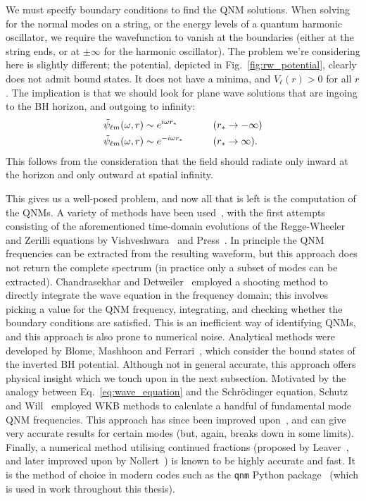 We must specify boundary conditions to find the QNM solutions.
When solving for the normal modes on a string, or the energy levels of a quantum harmonic oscillator, we require the wavefunction to vanish at the boundaries (either at the string ends, or at $\pm \infty$ for the harmonic oscillator).
The problem we're considering here is slightly different; the potential, depicted in Fig.~\ref{fig:rw_potential}, clearly does not admit bound states. 
It does not have a minima, and $V_\ell(r) > 0$ for all $r$.
The implication is that we should look for plane wave solutions that are ingoing to the BH horizon, and outgoing to infinity:
\begin{alignat}{2}
    &\tilde{\psi}_{\ell m}(\omega, r) \sim e^{i \omega r_*} \qquad &&\qty(r_* \rightarrow -\infty) \nonumber \\
    &\tilde{\psi}_{\ell m}(\omega, r) \sim e^{- i \omega r_*} \qquad &&\qty(r_* \rightarrow \infty).
\end{alignat}
This follows from the consideration that the field should radiate only inward at the horizon and only outward at spatial infinity.

This gives us a well-posed problem, and now all that is left is the computation of the QNMs. 
A variety of methods have been used~\cite{Kokkotas:1999bd, Berti:2004md}, with the first attempts consisting of the aforementioned time-domain evolutions of the Regge-Wheeler and Zerilli equations by Vishveshwara~\cite{Vishveshwara:1970zz} and Press~\cite{Press:1971wr}. 
In principle the QNM frequencies can be extracted from the resulting waveform, but this approach does not return the complete spectrum (in practice only a subset of modes can be extracted).
Chandrasekhar and Detweiler~\cite{Chandrasekhar:1975zza} employed a shooting method to directly integrate the wave equation in the frequency domain; this involves picking a value for the QNM frequency, integrating, and checking whether the boundary conditions are satisfied. 
This is an inefficient way of identifying QNMs, and this approach is also prone to numerical noise.
Analytical methods were developed by Blome, Mashhoon and Ferrari~\cite{BLOME1984231, Ferrari:1984ozr, Ferrari:1984zz}, which consider the bound states of the inverted BH potential. 
Although not in general accurate, this approach offers physical insight which we touch upon in the next subsection.
Motivated by the analogy between Eq.~\ref{eq:wave_equation} and the Schr\"{o}dinger equation, Schutz and Will~\cite{Schutz:1985km} employed WKB methods to calculate a handful of fundamental mode QNM frequencies.
This approach has since been improved upon~\cite{Iyer:1986np, Matyjasek:2017psv, Konoplya:2019hlu}, 
and can give very accurate results for certain modes (but, again, breaks down in some limits). 
Finally, a numerical method utilising continued fractions (proposed by Leaver~\cite{Leaver:1985ax}, and later improved upon by Nollert~\cite{Nollert:1993zz}) is known to be highly accurate and fast.
It is the method of choice in modern codes such as the \texttt{qnm} Python package~\cite{Stein:2019mop} (which is used in work throughout this thesis).

